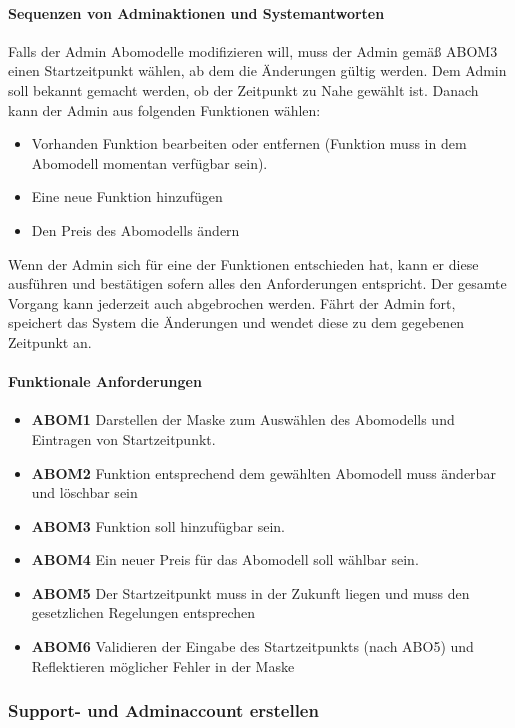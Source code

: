 \paragraph{Sequenzen von Adminaktionen und Systemantworten}
Falls der Admin Abomodelle modifizieren will, muss der Admin gemäß ABOM3 einen Startzeitpunkt wählen, ab dem die Änderungen gültig werden. Dem Admin soll bekannt gemacht werden, ob der Zeitpunkt zu Nahe gewählt ist. Danach kann der Admin aus folgenden Funktionen wählen:
\begin{itemize}
	\item Vorhanden Funktion bearbeiten oder entfernen (Funktion muss in dem Abomodell momentan verfügbar sein).
	\item Eine neue Funktion hinzufügen
	\item Den Preis des Abomodells ändern
\end{itemize}
Wenn der Admin sich für eine der Funktionen entschieden hat, kann er diese ausführen und bestätigen sofern alles den Anforderungen entspricht. Der gesamte Vorgang kann jederzeit auch abgebrochen werden. Fährt der Admin fort, speichert das System die Änderungen und wendet diese zu dem gegebenen Zeitpunkt an.

\paragraph{Funktionale Anforderungen}
\begin{itemize}
	\item \textbf{ABOM1} Darstellen der Maske zum Auswählen des Abomodells und Eintragen von Startzeitpunkt.
	\item \textbf{ABOM2} Funktion entsprechend dem gewählten Abomodell muss änderbar und löschbar sein
	\item \textbf{ABOM3} Funktion soll hinzufügbar sein.
	\item \textbf{ABOM4} Ein neuer Preis für das Abomodell soll wählbar sein.
	\item \textbf{ABOM5} Der Startzeitpunkt muss in der Zukunft liegen und muss den gesetzlichen Regelungen entsprechen
	\item \textbf{ABOM6} Validieren der Eingabe des Startzeitpunkts (nach ABO5) und Reflektieren möglicher Fehler in der Maske
\end{itemize}


\subsubsection{Support- und Adminaccount erstellen}
